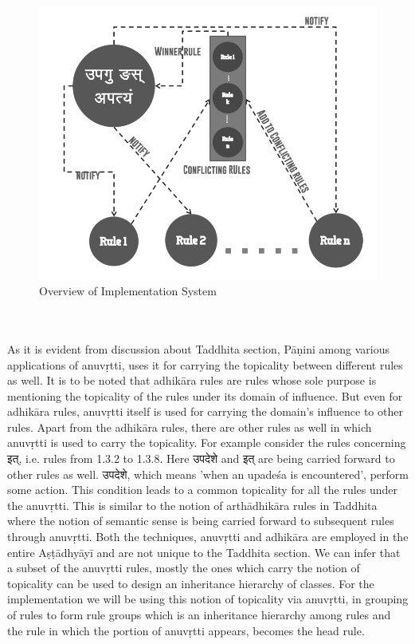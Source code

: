 \documentclass[a4paper,11pt,twoside,openright]{report}
\begin{document}
\begin{figure}[h]
    \centering
	\includegraphics[width=\textwidth]{impl}
    \caption{Overview of Implementation System}
    \label{fig:impl-fig}
\end{figure}
\\ \\
As it is evident from discussion about Taddhita section, Pāṇini among various applications of anuvṛtti, uses it for carrying the topicality between different rules as well. It is to be noted that adhikāra rules are rules whose sole purpose is mentioning the topicality of the rules under its domain of influence. But even for adhikāra rules, anuvṛtti itself is used for carrying the domain's influence to other rules. Apart from the adhikāra rules, there are other rules as well in which anuvṛtti is used to carry the topicality. For example consider the rules concerning {\skt  इत्}, i.e. rules from 1.3.2 to 1.3.8. Here {\skt उपदेशे and इत्} are being carried forward to other rules as well. {\skt उपदेशे}, which means 'when an upadeśa is encountered', perform some action. This condition leads to a common topicality for all the rules under the anuvṛtti. This is similar to the notion of arthādhikāra rules in Taddhita where the notion of semantic sense is being carried forward to subsequent rules through anuvṛtti. Both the techniques, anuvṛtti and adhikāra are employed in the entire Aṣṭādhyāyī and are not unique to the Taddhita section. We can infer that a subset of the anuvṛtti rules, mostly the ones which carry the notion of topicality can be used to design an inheritance hierarchy of classes.  For the  implementation we will be using this notion of topicality via anuvṛtti, in grouping of rules to form rule groups which is an inheritance hierarchy among rules and the rule in which the portion of anuvṛtti appears, becomes the head rule.
\\
\end{document}
